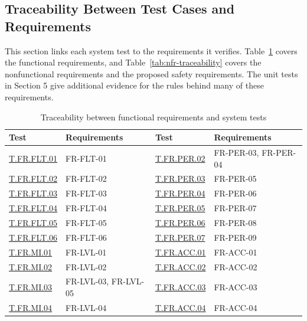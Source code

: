\documentclass[12pt, titlepage]{article}
\begin{document}
\subsection{Traceability Between Test Cases and Requirements}

This section links each system test to the requirements it verifies.
Table~\ref{tab:fr-traceability} covers the functional requirements, and
Table~\ref{tab:nfr-traceability} covers the nonfunctional requirements and the proposed
safety requirements. The unit tests in Section 5 give additional evidence for the rules
behind many of these requirements.

\begin{table}[H]
\centering
\small
\caption{Traceability between functional requirements and system tests}
\label{tab:fr-traceability}
\renewcommand{\arraystretch}{1.1}
\begin{tabularx}{\textwidth}{@{}p{}>{\raggedright\arraybackslash}X@{\hspace{1.5em}}p{}>{\raggedright\arraybackslash}X@{}}
\toprule
\textbf{Test} & \textbf{Requirements} & \textbf{Test} & \textbf{Requirements}\\
\midrule
\hyperlink{test-fr-fl01}{T.FR.FLT.01} & FR-FLT-01 & \hyperlink{test-fr-per-02}{T.FR.PER.02} & FR-PER-03, FR-PER-04\\
\hyperlink{test-fr-fl02}{T.FR.FLT.02} & FR-FLT-02 & \hyperlink{test-fr-per-03}{T.FR.PER.03} & FR-PER-05\\
\hyperlink{test-fr-fl03}{T.FR.FLT.03} & FR-FLT-03 & \hyperlink{test-fr-per-04}{T.FR.PER.04} & FR-PER-06\\
\hyperlink{test-fr-fl04}{T.FR.FLT.04} & FR-FLT-04 & \hyperlink{test-fr-per-05}{T.FR.PER.05} & FR-PER-07\\
\hyperlink{test-fr-fl05}{T.FR.FLT.05} & FR-FLT-05 & \hyperlink{test-fr-per-06}{T.FR.PER.06} & FR-PER-08\\
\hyperlink{test-fr-fl06}{T.FR.FLT.06} & FR-FLT-06 & \hyperlink{test-fr-per-07}{T.FR.PER.07} & FR-PER-09\\
\hyperlink{test-fr-mi-01}{T.FR.MI.01} & FR-LVL-01 & \hyperlink{test-fr-acc-01}{T.FR.ACC.01} & FR-ACC-01\\
\hyperlink{test-fr-mi-02}{T.FR.MI.02} & FR-LVL-02 & \hyperlink{test-fr-acc-02}{T.FR.ACC.02} & FR-ACC-02\\
\hyperlink{test-fr-mi-03}{T.FR.MI.03} & FR-LVL-03, FR-LVL-05 & \hyperlink{test-fr-acc-03}{T.FR.ACC.03} & FR-ACC-03\\
\hyperlink{test-fr-mi-04}{T.FR.MI.04} & FR-LVL-04 & \hyperlink{test-fr-acc-04}{T.FR.ACC.04} & FR-ACC-04\\

\end{tabularx}
\end{table}
\end{document}
